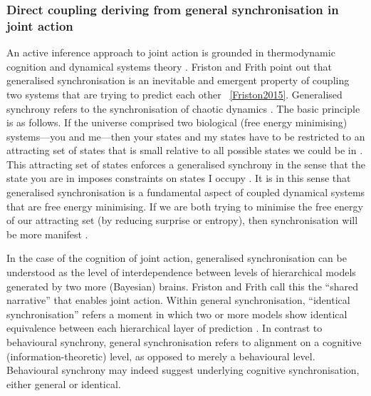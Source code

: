 \subsubsection{Direct coupling deriving from general synchronisation in joint action}

  An active inference approach to joint action is grounded in thermodynamic cognition and dynamical systems theory \citep{Friston2013}.  Friston and Frith point out that generalised synchronisation is an inevitable and emergent property of coupling two systems that are trying to predict each other ~\ref{Friston2015}.  Generalised synchrony refers to the synchronisation of chaotic dynamics \citep{Barreto2003}.  The basic principle is as follows.  If the universe comprised two biological (free energy minimising) systems---you and me---then your states and my states have to be restricted to an attracting set of states that is small relative to all possible states we could be in \citep{Friston2015}.  This attracting set of states enforces a generalised synchrony in the sense that the state you are in imposes constraints on states I occupy \citep{Richardson2015}.  It is in this sense that generalised synchronisation is a fundamental aspect of coupled dynamical systems that are free energy minimising.  If we are both trying to minimise the free energy of our attracting set (by reducing surprise or entropy), then synchronisation will be more manifest \citep{Friston2015a}.

In the case of the cognition of joint action, generalised synchronisation can be understood as the level of interdependence between levels of hierarchical models generated by two more (Bayesian) brains.  Friston and Frith call this the ``shared narrative'' that enables joint action.  Within general synchronisation, ``identical synchronisation'' refers a moment in which two or more models show identical equivalence between each hierarchical layer of prediction \citep{Friston2015}.   In contrast to behavioural synchrony, general synchronisation refers to alignment on a cognitive (information-theoretic) level, as opposed to merely a behavioural level. Behavioural synchrony may indeed suggest underlying cognitive synchronisation, either general or identical.
